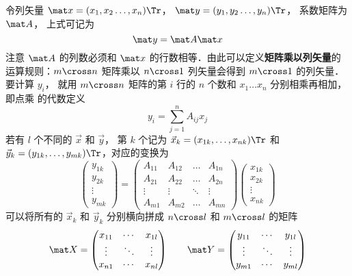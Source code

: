 令列矢量 $\mat x = (x_1,x_2 \dots, x_n)\Tr $，  $\mat y = (y_1,y_2 \dots, y_n)\Tr$， 系数矩阵为 $\mat A$， 上式可记为
\begin{equation}
\mat y = \mat A\mat x
\end{equation} 
注意 $\mat A$ 的列数必须和 $\mat x$ 的行数相等．由此可以定义\textbf{矩阵乘以列矢量}的运算规则：$m \cross n$ 矩阵乘以 $n \cross 1$ 列矢量会得到 $m \cross 1$ 的列矢量．要计算 $y_i$， 就用 $m \cross n$ 矩阵的第 $i$ 行的 $n$ 个数和 ${x_1}\dots{x_n}$ 分别相乘再相加，即点乘 的代数定义
\begin{equation}
{y_i} = \sum\limits_{j = 1}^n {{A_{ij}}{x_j}} 
\end{equation}
若有 $l$ 个不同的 $\vec x$ 和 $\vec y$， 第 $k$ 个记为 $\vec x_k = (x_{1k},\dots, x_{nk})\Tr$ 和 $\vec y_k = (y_{1k},\dots, y_{mk})\Tr$，对应的变换为
\begin{equation}
\begin{pmatrix} y_{1k} \\ y_{2k}\\ \vdots \\ y_{mk} \end{pmatrix}
= \begin{pmatrix}
A_{11}  & A_{12} & \ldots & A_{1n} \\
A_{21}  & A_{22} & \ldots & A_{2n} \\
 \vdots & \vdots  & \ddots & \vdots \\
A_{m1}  & A_{m2} & \ldots & A_{mn}
\end{pmatrix}
\begin{pmatrix} x_{1k} \\ x_{2k} \\ \vdots \\ x_{nk} \end{pmatrix}
\end{equation}
可以将所有的 $\vec x_k$ 和 $\vec y_k$ 分别横向拼成 $n \cross l$ 和 $m \cross l$ 的矩阵
\begin{equation}
\mat X =
\begin{pmatrix}
x_{11} & \cdots & x_{1l} \\
 \vdots & \ddots & \vdots \\
x_{n1} & \cdots & x_{nl}
\end{pmatrix}
\qquad
\mat Y =
\begin{pmatrix}
y_{11} & \cdots & y_{1l} \\
 \vdots & \ddots & \vdots \\
y_{m1} & \cdots & y_{ml}
\end{pmatrix}
\end{equation}
